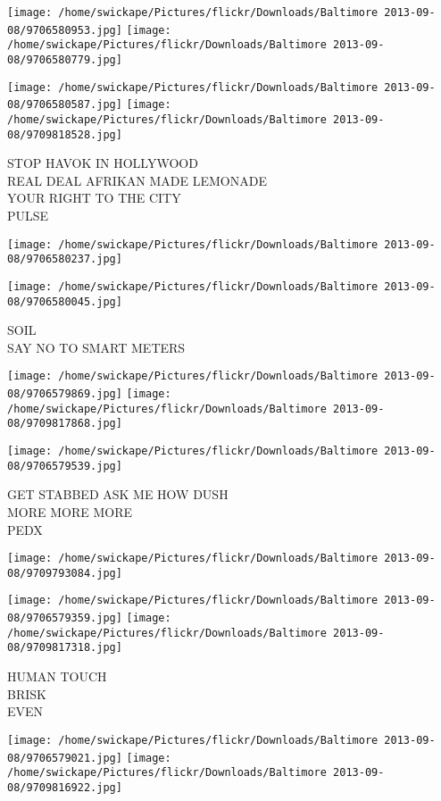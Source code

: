 \documentclass[10pt,letterpaper]{article}
\begin{document}
\texttt{[image: /home/swickape/Pictures/flickr/Downloads/Baltimore 2013-09-08/9706580953.jpg]}
\texttt{[image: /home/swickape/Pictures/flickr/Downloads/Baltimore 2013-09-08/9706580779.jpg]}

\texttt{[image: /home/swickape/Pictures/flickr/Downloads/Baltimore 2013-09-08/9706580587.jpg]}
\texttt{[image: /home/swickape/Pictures/flickr/Downloads/Baltimore 2013-09-08/9709818528.jpg]}

STOP HAVOK IN HOLLYWOOD\\
REAL DEAL AFRIKAN MADE LEMONADE\\
YOUR RIGHT TO THE CITY\\
PULSE
\pagebreak

\texttt{[image: /home/swickape/Pictures/flickr/Downloads/Baltimore 2013-09-08/9706580237.jpg]}

\vspace{0.25in}
\texttt{[image: /home/swickape/Pictures/flickr/Downloads/Baltimore 2013-09-08/9706580045.jpg]}

SOIL\\
SAY NO TO SMART METERS
\pagebreak

\texttt{[image: /home/swickape/Pictures/flickr/Downloads/Baltimore 2013-09-08/9706579869.jpg]}
\texttt{[image: /home/swickape/Pictures/flickr/Downloads/Baltimore 2013-09-08/9709817868.jpg]}

\texttt{[image: /home/swickape/Pictures/flickr/Downloads/Baltimore 2013-09-08/9706579539.jpg]}

GET STABBED ASK ME HOW DUSH\\
MORE MORE MORE\\
PEDX
\pagebreak

\texttt{[image: /home/swickape/Pictures/flickr/Downloads/Baltimore 2013-09-08/9709793084.jpg]}

\vspace{0.25in}
\texttt{[image: /home/swickape/Pictures/flickr/Downloads/Baltimore 2013-09-08/9706579359.jpg]}
\texttt{[image: /home/swickape/Pictures/flickr/Downloads/Baltimore 2013-09-08/9709817318.jpg]}

HUMAN TOUCH\\
BRISK\\
EVEN
\pagebreak

\texttt{[image: /home/swickape/Pictures/flickr/Downloads/Baltimore 2013-09-08/9706579021.jpg]}
\texttt{[image: /home/swickape/Pictures/flickr/Downloads/Baltimore 2013-09-08/9709816922.jpg]}
\end{document}
